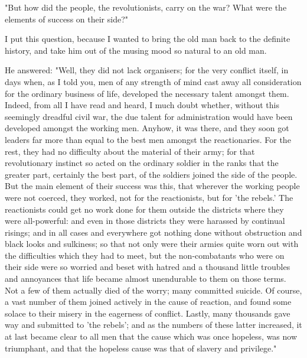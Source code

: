 "But how did the people, the revolutionists, carry on the war? What were
the elements of success on their side?"

I put this question, because I wanted to bring the old man back to the
definite history, and take him out of the musing mood so natural to an
old man.

He answered: "Well, they did not lack organisers; for the very conflict
itself, in days when, as I told you, men of any strength of mind cast
away all consideration for the ordinary business of life, developed the
necessary talent amongst them. Indeed, from all I have read and heard, I
much doubt whether, without this seemingly dreadful civil war, the due
talent for administration would have been developed amongst the working
men. Anyhow, it was there, and they soon got leaders far more than equal
to the best men amongst the reactionaries. For the rest, they had no
difficulty about the material of their army; for that revolutionary
instinct so acted on the ordinary soldier in the ranks that the greater
part, certainly the best part, of the soldiers joined the side of the
people. But the main element of their success was this, that wherever
the working people were not coerced, they worked, not for the
reactionists, but for 'the rebels.' The reactionists could get no work
done for them outside the districts where they were all-powerful: and
even in those districts they were harassed by continual risings; and in
all cases and everywhere got nothing done without obstruction and black
looks and sulkiness; so that not only were their armies quite worn out
with the difficulties which they had to meet, but the non-combatants who
were on their side were so worried and beset with hatred and a thousand
little troubles and annoyances that life became almost unendurable to
them on those terms. Not a few of them actually died of the worry; many
committed suicide. Of course, a vast number of them joined actively in
the cause of reaction, and found some solace to their misery in the
eagerness of conflict. Lastly, many thousands gave way and submitted to
'the rebels'; and as the numbers of these latter increased, it at last
became clear to all men that the cause which was once hopeless, was now
triumphant, and that the hopeless cause was that of slavery and
privilege."
